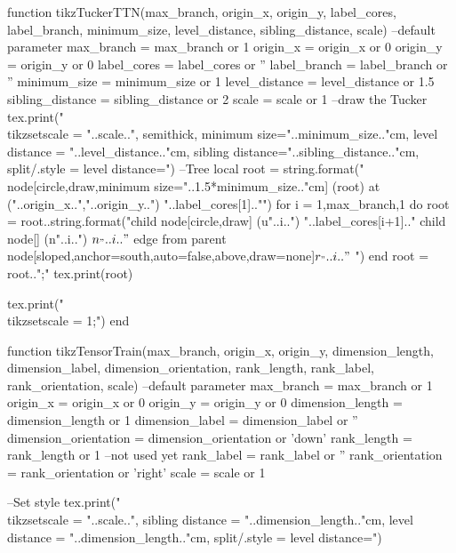 \begin{luacode*}
	function tikzTuckerTTN(max_branch, origin_x, origin_y, label_cores, label_branch, minimum_size, level_distance, sibling_distance, scale)
	  --default parameter
	  max_branch = max_branch or 1
	  origin_x = origin_x or 0
	  origin_y = origin_y or 0
	  label_cores = label_cores or ''
	  label_branch = label_branch or ''
	  minimum_size = minimum_size or 1
	  level_distance = level_distance or 1.5
	  sibling_distance = sibling_distance or 2
	  scale = scale or 1
	  --draw the Tucker
	  tex.print("\\tikzset{scale = "..scale..", semithick, minimum size="..minimum_size.."cm, level distance = "..level_distance.."cm, sibling distance="..sibling_distance.."cm, split/.style = {level distance=}}")
	  --Tree
	  local root = string.format("\\node[circle,draw,minimum size="..1.5*minimum_size.."cm] (root) at ("..origin_x..","..origin_y..") {"..label_cores[1].."}")
	  for i = 1,max_branch,1 do 
		root = root..string.format("child { node[circle,draw] (u"..i..") {"..label_cores[i+1].."} child { node[] (n"..i..") {$n_"..i.."$} } edge from parent node[sloped,anchor=south,auto=false,above,draw=none]{$r_"..i.."$} }")
	  end
	  root = root..";"
	  tex.print(root)
	  
	  tex.print("\\tikzset{scale = 1};")
	end
  
	function tikzTensorTrain(max_branch, origin_x, origin_y, dimension_length, dimension_label, dimension_orientation, rank_length, rank_label, rank_orientation, scale)
	  --default parameter
	  max_branch = max_branch or 1
	  origin_x = origin_x or 0
	  origin_y = origin_y or 0
	  dimension_length = dimension_length or 1
	  dimension_label = dimension_label or ''
	  dimension_orientation = dimension_orientation or 'down'
	  rank_length = rank_length or 1 --not used yet
	  rank_label = rank_label or ''
	  rank_orientation = rank_orientation or 'right'
	  scale = scale or 1
	  
	  --Set style
	  tex.print("\\tikzset{scale = "..scale..", sibling distance = "..dimension_length.."cm, level distance = "..dimension_length.."cm, split/.style = {level distance=}}")
	  

\end{luacode*}
